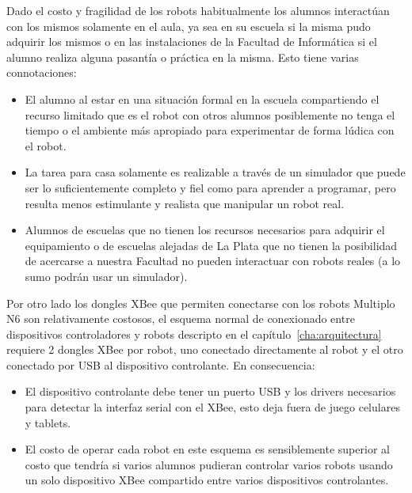 Dado el costo y fragilidad de los robots habitualmente los alumnos interactúan
con los mismos solamente en el aula, ya sea en su escuela si la misma pudo adquirir los mismos o en las instalaciones de la  Facultad de Informática si el alumno
realiza alguna pasantía o práctica en la misma. Esto tiene varias connotaciones:
\begin{itemize}
    \item El alumno al estar en una situación formal en la escuela
        compartiendo el recurso limitado que es el robot con otros
        alumnos posiblemente no tenga el tiempo o el ambiente más apropiado
        para experimentar de forma lúdica con el robot.
    \item La tarea para casa solamente es realizable a través de un simulador
        que puede ser lo suficientemente completo y fiel como para aprender
        a programar, pero resulta menos estimulante y realista que manipular
        un robot real.
    \item Alumnos de escuelas que no tienen los recursos necesarios para
        adquirir el equipamiento o de escuelas alejadas de La Plata que
        no tienen la posibilidad de acercarse a nuestra
        Facultad no pueden interactuar con robots reales
        (a lo sumo podrán usar un simulador).
\end{itemize}

Por otro lado los dongles XBee que permiten conectarse con los robots
Multiplo N6
son relativamente costosos, el esquema normal de conexionado entre dispositivos
controladores y robots descripto en el capítulo~\ref{cha:arquitectura} requiere
2 dongles XBee por robot, uno conectado directamente al robot y el otro
conectado por USB al dispositivo controlante. En consecuencia:
\begin{itemize}
    \item El dispositivo controlante debe tener un puerto USB y los drivers
        necesarios para detectar la interfaz serial con el XBee, esto deja
        fuera de juego celulares y tablets.
    \item El costo de operar cada robot en este esquema es sensiblemente
        superior al costo que tendría si varios alumnos pudieran
        controlar varios robots usando un solo dispositivo XBee compartido
        entre varios dispositivos controlantes.
\end{itemize}

